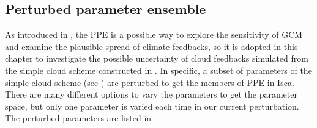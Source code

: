 
\subsection{Perturbed parameter ensemble}
\label{sec:PPE_setup}
 
As introduced in , the PPE is a possible way to explore the sensitivity of GCM and examine the plausible spread of climate feedbacks, so it is adopted in this chapter to investigate the possible uncertainty of cloud feedbacks simulated from the simple cloud scheme constructed in . In specific, a subset of parameters of the simple cloud scheme (see ) are perturbed to get the members of PPE in Isca. There are many different options to vary the parameters to get the parameter space, but only one parameter is varied each time in our current perturbation. The perturbed parameters are listed in .

